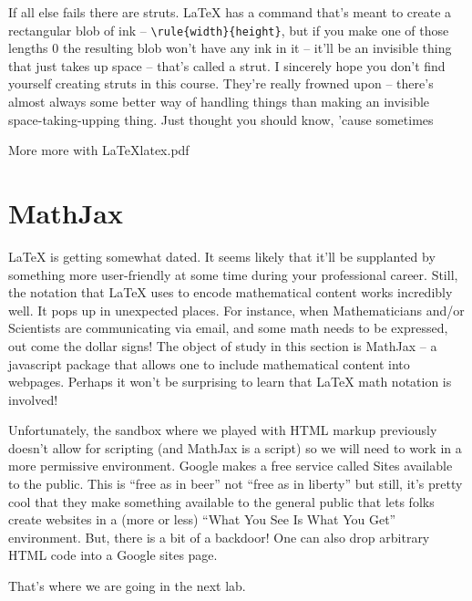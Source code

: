 If all else fails there are struts.  \LaTeX{} has a command that's meant to create a rectangular blob of ink -- 
\verb+\rule{width}{height}+, but if you make one of those lengths $0$ the resulting blob won't have any ink in it -- it'll be an invisible thing that just takes up space -- that's called a strut.  I sincerely hope you don't find yourself creating struts in this course.  They're really frowned upon -- there's almost always some better way of handling things than making an invisible space-taking-upping thing.  Just thought you should know, 'cause sometimes\textellipsis

\clearpage
\begin{worksheet}{4}{More more with \LaTeX}{latex.pdf}

\end{worksheet}
\clearpage

\section{MathJax}
\label{sec:mathjax}

\LaTeX{} is getting somewhat dated.  It seems likely that it'll be supplanted by something more user-friendly at some time during your professional career.  Still, the notation that \LaTeX{} uses to encode mathematical content works incredibly well.  It pops up in unexpected places.  For instance, when Mathematicians and/or Scientists are communicating via email, and some math needs to be expressed, out come the dollar signs!  The object of study in this section is MathJax -- a javascript package that allows one to include mathematical content into webpages.  Perhaps it won't be surprising to learn that \LaTeX{} math notation is involved!

Unfortunately, the sandbox where we played with HTML markup previously doesn't allow for scripting (and MathJax is a script) so we will need to work in a more permissive environment.  Google makes a free service called Sites available to the public.  This is ``free as in beer'' not ``free as in liberty'' but still, it's pretty cool that they make something available to the general public that lets folks create websites in a (more or less) ``What You See Is What You Get'' environment.  But, there is a bit of a backdoor!  One can also drop arbitrary HTML code into a Google sites page.  

That's where we are going in the next lab.

\clearpage
{}
\clearpage


